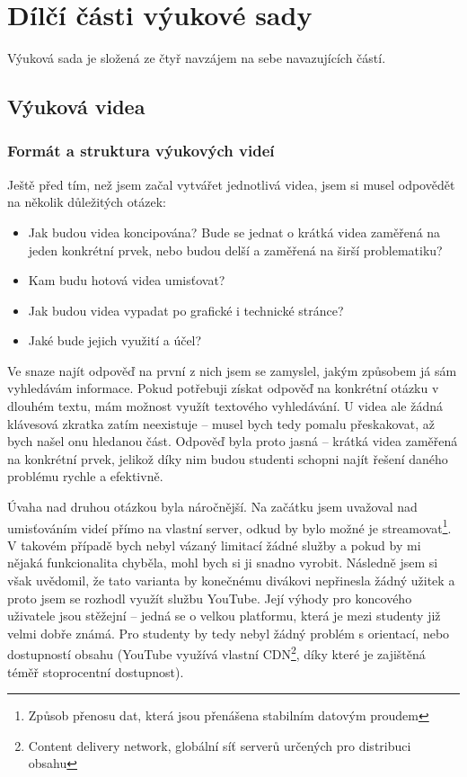 \chapter{Dílčí části výukové sady}
Výuková sada je složená ze čtyř navzájem na sebe navazujících částí.
\fxnote[inline=true]{\textcolor{mygreen}{Sem ještě něco dopíšu, jen zatím nevím co...}}

\section{Výuková videa}
\fxnote[inline=true]{\textcolor{mygreen}{Sem ještě něco dopíšu, jen zatím nevím co...}}

\subsection{Formát a struktura výukových videí}
Ještě před tím, než jsem začal vytvářet jednotlivá videa, jsem si musel odpovědět na několik důležitých otázek:
\begin{itemize}[topsep=0pt]
    \setlength\itemsep{0em}
    \item Jak budou videa koncipována? Bude se jednat o krátká videa zaměřená na jeden konkrétní prvek, nebo budou delší a zaměřená na širší problematiku?
    \item Kam budu hotová videa umisťovat?
    \item Jak budou videa vypadat po grafické i technické stránce?
    \item Jaké bude jejich využití a účel?
\end{itemize}

Ve snaze najít odpověď na první z nich jsem se zamyslel, jakým způsobem já sám vyhledávám informace.
Pokud potřebuji získat odpověď na konkrétní otázku v dlouhém textu, mám možnost využít textového vyhledávání. 
U videa ale žádná klávesová zkratka  zatím neexistuje -- musel bych tedy pomalu přeskakovat, až bych našel onu hledanou část.
Odpověď byla proto jasná -- krátká videa zaměřená na konkrétní prvek, jelikož díky nim budou studenti schopni najít řešení daného problému rychle a efektivně.

Úvaha nad druhou otázkou byla náročnější.
Na začátku jsem uvažoval nad umisťováním videí přímo na vlastní server, odkud by bylo možné je streamovat\footnote{Způsob přenosu dat, která jsou přenášena stabilním datovým proudem}.
V takovém případě bych nebyl vázaný limitací žádné služby a pokud by mi nějaká funkcionalita chyběla, mohl bych si ji snadno vyrobit.
Následně jsem si však uvědomil, že tato varianta by konečnému divákovi nepřinesla žádný užitek a proto jsem se rozhodl využít službu YouTube.
Její výhody pro koncového uživatele jsou stěžejní -- jedná se o velkou platformu, která je mezi studenty již velmi dobře známá.
Pro studenty by tedy nebyl žádný problém s orientací, nebo dostupností obsahu (YouTube využívá vlastní CDN\footnote{Content delivery network, globální síť serverů určených pro distribuci obsahu}, díky které je zajištěná téměř stoprocentní dostupnost).

